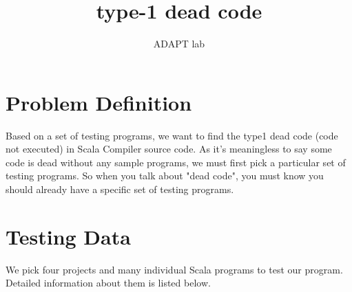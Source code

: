 \documentclass[a4paper]{article}
\title{type-1 dead code}
\author{ADAPT lab}
\begin{document}
\maketitle

\section{Problem Definition}
Based on a set of testing programs, we want to find the type1 dead code (code not executed) in Scala Compiler source code. As it's meaningless to say some code is dead without any sample programs, we must first pick a particular set of testing programs. So when you talk about "dead code", you must know you should already have a specific set of testing programs.


\section{Testing Data}
We pick four projects and many individual Scala programs to test our program. Detailed information about them is listed below.
\end{document}
